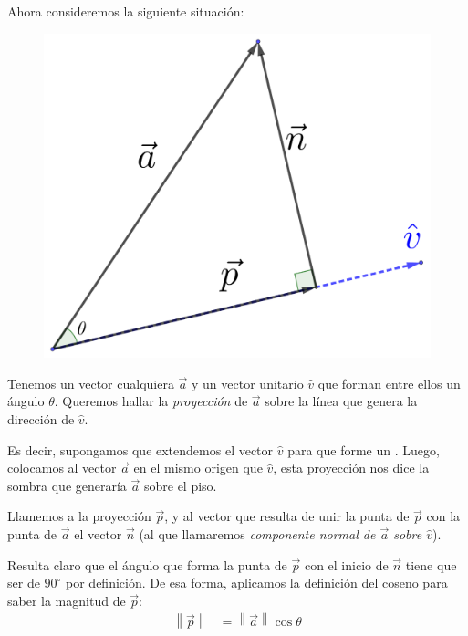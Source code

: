 \documentclass[12pt, fleqn]{report}                             %
\newcommand \Quote {\qq}                                        %
\theoremstyle{break}                                            %
\newcommand{\Abs}[1]{\left\lVert #1 \right\lVert}               %
\begin{document}
            Ahora consideremos la siguiente situación:
            
            \begin{figure}[H]
                \centering
                \includegraphics[scale=1.1]{vectorProyection.png}
            \end{figure}
        
            Tenemos un vector cualquiera $\vec{a}$ y un vector unitario $\hat{v}$ que forman entre ellos un ángulo $\theta$. Queremos hallar la \emph{proyección} de $\vec{a}$ sobre la línea que genera la dirección de $\hat{v}$.
            
            Es decir, supongamos que extendemos el vector $\hat{v}$ para que forme un \Quote{piso}. Luego, colocamos al vector $\vec{a}$ en el mismo origen que $\hat{v}$, esta proyección nos dice la sombra que generaría $\vec{a}$ sobre el piso.
            
            Llamemos a la proyección $\vec{p}$, y al vector que resulta de unir la punta de $\vec{p}$ con la punta de $\vec{a}$ el vector $\vec{n}$ (al que llamaremos \emph{componente normal de $\vec{a}$ sobre $\hat{v}$}).
            
            Resulta claro que el ángulo que forma la punta de $\vec{p}$ con el inicio de $\vec{n}$ tiene que ser de $90^\circ$ por definición. De esa forma, aplicamos la definición del coseno para saber la magnitud de $\vec{p}$:
            \begin{align}
                {\Abs{\vec{p}}} &= \Abs{\vec{a}} \cos \theta
            \end{align}
        
\end{document}

